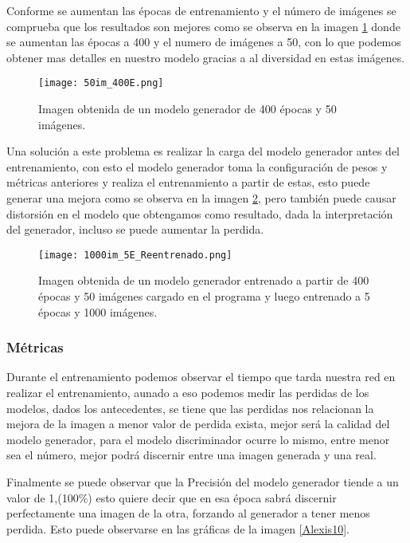 Conforme se aumentan las épocas de entrenamiento y el número de imágenes se comprueba
que los resultados son mejores como se observa en la imagen \ref{Alexis8} donde se aumentan
las épocas a 400 y el numero de imágenes a 50, con lo que podemos obtener mas detalles en nuestro modelo
gracias a al diversidad en estas imágenes.

\begin{figure}[H]
  \begin{center}
    \texttt{[image: 50im\_400E.png]}
    \caption{Imagen obtenida de un modelo generador de 400 épocas y 50 imágenes.}
    \label{Alexis8}
  \end{center}
\end{figure}

Una solución a este problema es realizar la carga del modelo generador antes del entrenamiento,
con esto el modelo generador toma la configuración de pesos y métricas anteriores y realiza el entrenamiento
a partir de estas, esto puede generar una mejora como se observa en la imagen \ref{Alexis9}, pero
también puede causar distorsión en el modelo que obtengamos como resultado, dada la interpretación del generador,
incluso se puede aumentar la perdida.

\begin{figure}[H]
  \begin{center}
    \texttt{[image: 1000im\_5E\_Reentrenado.png]}
    \caption{Imagen obtenida de un modelo generador entrenado a partir de 400 épocas y 50 imágenes cargado
    en el programa y luego entrenado a 5 épocas y 1000 imágenes.}
    \label{Alexis9}
  \end{center}
\end{figure}




\subsubsection{Métricas}

 Durante el entrenamiento podemos observar el tiempo que tarda nuestra red en realizar el entrenamiento, aunado a eso 
 podemos medir las perdidas de los modelos, dados los antecedentes, se tiene que las perdidas nos relacionan la mejora de la imagen
 a menor valor de perdida exista, mejor será la calidad del modelo generador, para el modelo discriminador ocurre lo mismo,
 entre menor sea el número, mejor podrá discernir entre una imagen generada y una real.

 Finalmente se puede observar que la Precisión del modelo generador tiende a un valor de 1,(100\%) esto quiere decir que
 en esa época sabrá discernir perfectamente una imagen de la otra, forzando al generador a tener menos perdida. Esto puede observarse en las
 gráficas de la imagen \ref{Alexis10}.

